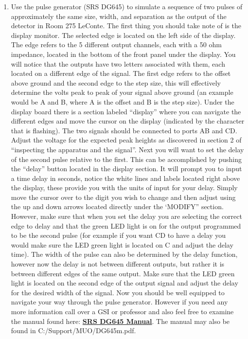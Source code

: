 \documentclass{../lab}
\begin{document}
\begin{enumerate}
    \item Use the pulse generator (SRS DG645) to simulate a sequence of two pulses of approximately the same size, width, and separation as the output of the detector in Room 275 LeConte. The first thing you should take note of is the display monitor. The selected edge is located on the left side of the display. The edge refers to the 5 different output channels, each with a 50 ohm impedance, located in the bottom of the front panel under the display. You will notice that the outputs have two letters associated with them, each located on a different edge of the signal. The first edge refers to the offset above ground and the second edge to the step size, this will effectively determine the volts peak to peak of your signal above ground (an example would be A and B, where A is the offset and B is the step size). Under the display board there is a section labeled ``display'' where you can navigate the different edges and move the cursor on the display (indicated by the character that is flashing). The two signals should be connected to ports AB and CD. Adjust the voltage for the expected peak heights as discovered in section 2 of ``inspecting the apparatus and the signal''. Next you will want to set the delay of the second pulse relative to the first. This can be accomplished by pushing the ``delay'' button located in the display section. It will prompt you to input a time delay in seconds, notice the white lines and labels located right above the display, these provide you with the units of input for your delay. Simply move the cursor over to the digit you wish to change and then adjust using the up and down arrows located directly under the ‘MODIFY” section. However, make sure that when you set the delay you are selecting the correct edge to delay and that the green LED light is on for the output programmed to be the second pulse (for example if you want CD to have a delay you would make sure the LED green light is located on C and adjust the delay time). The width of the pulse can also be determined by the delay function, however now the delay is not between different outputs, but rather it is between different edges of the same output. Make sure that the LED green light is located on the second edge of the output signal and adjust the delay for the desired width of the signal. Now you should be well equipped to navigate your way through the pulse generator. However if you need any more information call over a GSI or professor and also feel free to examine the manual found here: \href{http://www.thinksrs.com/downloads/PDFs/Manuals/DG645m.pdf}{\textbf{SRS DG645 Manual}}. The manual may also be found in C:/Support/MUO/DG645m.pdf.
    

\end{enumerate}
\end{document}
